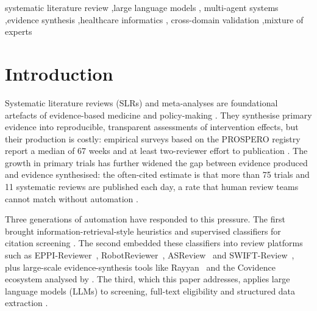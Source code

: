 \documentclass[a4paper,fleqn]{cas-sc}
\begin{document}
\begin{keywords}
systematic literature review \sep large language models \sep
multi-agent systems \sep evidence synthesis \sep healthcare informatics \sep
cross-domain validation \sep mixture of experts
\end{keywords}

\maketitle

\linenumbers

\section{Introduction}\label{sec:intro}

Systematic literature reviews (SLRs) and meta-analyses are foundational
artefacts of evidence-based medicine and policy-making
\citep{higgins2019cochrane,page2021prisma}. They synthesise primary
evidence into reproducible, transparent assessments of intervention
effects, but their production is costly: empirical surveys based on the
PROSPERO registry report a median of 67 weeks and at least
two-reviewer effort to publication
\citep{borah2017slrtime,allen1999estimatingtime}. The growth in primary
trials has further widened the gap between evidence produced and evidence
synthesised: the often-cited estimate is that more than 75 trials and
11 systematic reviews are published each day, a rate that human
review teams cannot match without automation
\citep{bastian2010seventyfive,elliott2017living}.

Three generations of automation have responded to this pressure. The first
brought information-retrieval-style heuristics and supervised
classifiers for citation screening
\citep{cohen2006reducing,wallace2010active,bannach2019machine}. The second
embedded these classifiers into review platforms such as
EPPI-Reviewer~\citep{thomas2017eppi}, RobotReviewer~\citep{marshall2017robotreviewer},
ASReview~\citep{vandeschoot2021asreview} and SWIFT-Review~\citep{howard2016swift},
plus large-scale evidence-synthesis tools like
Rayyan~\citep{ouzzani2016rayyan} and the Covidence ecosystem analysed by
\citet{harrison2020covidence,vandinter2021distillersr}. The third, which
this paper addresses, applies large language models (LLMs) to screening,
full-text eligibility and structured data extraction
\citep{khraisha2024llmsr,gartlehner2024aisr,guo2024llmsr,wang2023llmscreen,
syriani2024screening,sundaram2023automating}.
\end{document}
